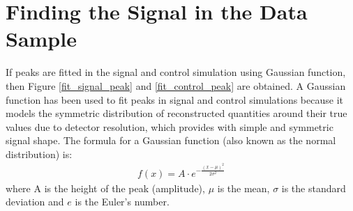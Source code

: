     \section{Finding the Signal in the Data Sample}
    If peaks are fitted in the signal and control simulation using Gaussian function, then Figure \ref{fit_signal_peak} and \ref{fit_control_peak} are obtained. A Gaussian function has been used to fit peaks in signal and control simulations because it models the symmetric distribution of reconstructed quantities around their true values due to detector resolution, which provides with simple and symmetric signal shape. The formula for a Gaussian function (also known as the normal distribution) is:\\

    \begin{align}
        f(x) = A \cdot e^{-\frac{(x - \mu)^2}{2\sigma^2}}
    \end{align}
    where A is the height of the peak (amplitude), $\mu$ is the mean, $\sigma$ is the standard deviation and $e$ is the Euler's number.\\
